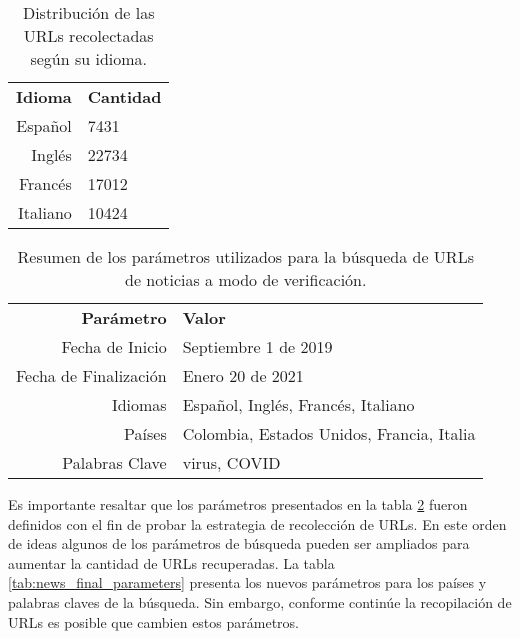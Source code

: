 \begin{table}[h]
    \centering
    \begin{tabular}{r|l}
        \textbf{Idioma} & \textbf{Cantidad} \\
        Español & 7431 \\
        Inglés & 22734 \\
        Francés & 17012 \\
        Italiano & 10424
        
    \end{tabular}
    \caption{Distribución de las URLs recolectadas según su idioma.}
    \label{tab:news_results}
\end{table}

\begin{table}[h]
    \centering
    \begin{tabular}{r|l}
        \textbf{Parámetro} & \textbf{Valor} \\
        Fecha de Inicio & Septiembre 1 de 2019 \\
        Fecha de Finalización & Enero 20 de 2021 \\
        Idiomas & Español, Inglés, Francés, Italiano \\
        Países & Colombia, Estados Unidos, Francia, Italia \\
        Palabras Clave & virus, COVID
    \end{tabular}
    \caption{Resumen de los parámetros utilizados para la búsqueda de URLs de noticias a modo de verificación.}
    \label{tab:news_parameters}
\end{table}

Es importante resaltar que los parámetros presentados en la tabla \ref{tab:news_parameters} fueron definidos con el fin de probar la estrategia de recolección de URLs. En este orden de ideas algunos de los parámetros de búsqueda pueden ser ampliados para aumentar la cantidad de URLs recuperadas. La tabla \ref{tab:news_final_parameters} presenta los nuevos parámetros para los países y palabras claves de la búsqueda. Sin embargo, conforme continúe la recopilación de URLs es posible que cambien estos parámetros.


